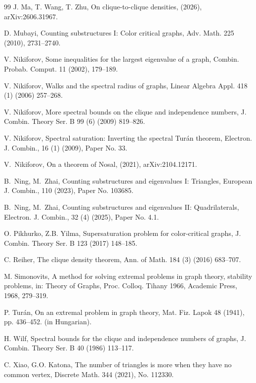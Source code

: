 \documentclass[11pt,a4paper]{article}
\theoremstyle{definition}
\theoremstyle{plain}
\begin{document}
\begin{thebibliography}{99}
J. Ma, T. Wang, T. Zhu, 
On clique-to-clique densities, 
(2026), arXiv:2606.31967. 


D. Mubayi,
{Counting substructures I: Color critical graphs},
Adv. Math. 225 (2010), 2731--2740.

V. Nikiforov,
{Some inequalities for the largest eigenvalue of a graph},
Combin. Probab. Comput. 11 (2002), 179--189.

V. Nikiforov, Walks and the spectral radius of graphs, 
Linear Algebra Appl. 418 (1) (2006) 257--268.


V. Nikiforov, More spectral bounds on the clique and independence numbers, 
J. Combin. Theory Ser. B 99 (6) (2009) 819--826. 

V. Nikiforov, Spectral saturation: Inverting the spectral Tur\'an theorem,  
Electron. J. Combin., 16 (1) (2009), Paper No. 33.

V.~Nikiforov, 
On a theorem of {Nosal}, (2021), 
arXiv:2104.12171.

B.~Ning, M.~Zhai, 
Counting substructures and eigenvalues {I}: {Triangles}, 
{European J. Combin.}, 110 (2023), Paper No. 103685.

B.~Ning, M.~Zhai, 
Counting substructures and eigenvalues {II}: {Quadrilaterals}, 
{Electron. J. Combin.}, 32 (4) (2025), Paper No. 4.1.


O. Pikhurko, Z.B. Yilma, 
Supersaturation problem for color-critical graphs, 
J. Combin. Theory Ser. B 123 (2017) 148--185.

 C. Reiher, The clique density theorem, 
 Ann. of Math. 184 (3) (2016) 683--707.

M. Simonovits,
{A method for solving extremal problems in graph theory, stability problems},
in: Theory of Graphs, Proc. Colloq. Tihany 1966, Academic Press, 1968, 279--319.

P. Tur\'{a}n,
On an extremal problem in graph theory,
Mat. Fiz. Lapok 48 (1941), pp. 436--452.
(in Hungarian).


H. Wilf, 
Spectral bounds for the clique and independence numbers of graphs, 
J. Combin. Theory Ser. B 40 (1986) 113--117.  

C. Xiao, G.O. Katona, 
 The number of triangles is more when they have no 
 common vertex, Discrete Math. 344 (2021), No. 112330. 


\end{thebibliography}
\end{document}
